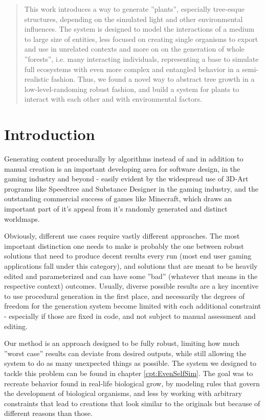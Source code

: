 \documentclass[11pt]{scrartcl}
\begin{document}
\begin{abstract}

This work introduces a way to generate ''plants'', especially tree-esque structures, depending on the simulated light and other environmental influences. The system is designed to model the interactions of a medium to large size of entities, less focused on creating single organisms to export and use in unrelated contexts and more on on the generation of whole ''forests'', i.e. many interacting individuals, representing a base to simulate full ecosystems with even more complex and entangled behavior in a semi-realistic fashion. Thus, we found a novel way to abstract tree growth in a low-level-randoming robust fashion, and build a system for plants to interact with each other and with environmental factors.
\end{abstract}

\section{Introduction}
Generating content procedurally by algorithms instead of and in addition to manual creation is an important developing area for software design, in the gaming industry and beyond - easily evident by the widespread use of 3D-Art programs like Speedtree and Substance Designer in the gaming industry, and the outstanding commercial success of games like Minecraft, which draws an important part of it's appeal from it's randomly generated and distinct worldmaps.

Obviously, different use cases require vastly different approaches. The most important distinction one needs to make is probably the one between robust solutions that need to produce decent results every run (most end user gaming applications fall under this category), and solutions that are meant to be heavily edited and parameterized and can have some ''bad'' (whatever that means in the respective context) outcomes. Usually, diverse possible results are a key incentive to use procedural generation in the first place, and necessarily the degrees of freedom for the generation system become limited with each additional constraint - especially if those are fixed in code, and not subject to manual assessment and editing.

Our method is an approach designed to be fully robust, limiting how much ''worst case'' results can deviate from desired outputs, while still allowing the system to do as many unexpected things as possible. The system we designed to tackle this problem can be found in chapter \ref{cpt:EvenSelfSim}. The goal was to recreate behavior found in real-life biological grow, by modeling rules that govern the development of biological organisms, and less by working with arbitrary constraints that lead to creations that look similar to the originals but because of different reasons than those.
\end{document}
